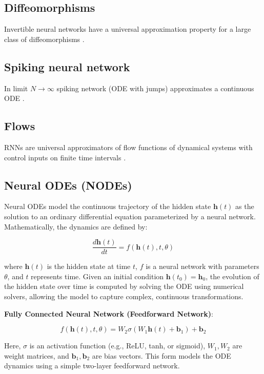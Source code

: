 \documentclass{article}
\theoremstyle{definition}
\theoremstyle{remark}
\begin{document}
\subsection{Diffeomorphisms}
Invertible neural networks have a universal approximation property for a  large class of diffeomorphisms   \citep{ishikawa2023universal}.



\subsection{Spiking neural network}
In limit $N\rightarrow\infty$ spiking network (ODE with jumps) approximates a continuous ODE \citep{podlaski2024approximating}. 

\subsection{Flows}
RNNs are universal approximators of flow  functions of dynamical systems  with control inputs on finite time intervals  \citep{aguiar2023}.




\subsection{Neural ODEs (NODEs)}
Neural ODEs\citep{chen2018neural} model the continuous trajectory of the hidden state \( \mathbf{h}(t) \) as the solution to an ordinary differential equation parameterized by a neural network. Mathematically, the dynamics are defined by:

\[
\frac{d \mathbf{h}(t)}{dt} = f(\mathbf{h}(t), t, \theta)
\]

where \( \mathbf{h}(t) \) is the hidden state at time \( t \), \( f \) is a neural network with parameters \( \theta \), and \( t \) represents time. Given an initial condition \( \mathbf{h}(t_0) = \mathbf{h}_0 \), the evolution of the hidden state over time is computed by solving the ODE using numerical solvers, allowing the model to capture complex, continuous transformations.

\textbf{Fully Connected Neural Network (Feedforward Network)}:

\[
f(\mathbf{h}(t), t, \theta) = W_2 \sigma(W_1 \mathbf{h}(t) + \mathbf{b}_1) + \mathbf{b}_2
\]

Here, \( \sigma \) is an activation function (e.g., ReLU, tanh, or sigmoid), \( W_1, W_2 \) are weight matrices, and \( \mathbf{b}_1, \mathbf{b}_2 \) are bias vectors.
 This form models the ODE dynamics using a simple two-layer feedforward network.
\end{document}
